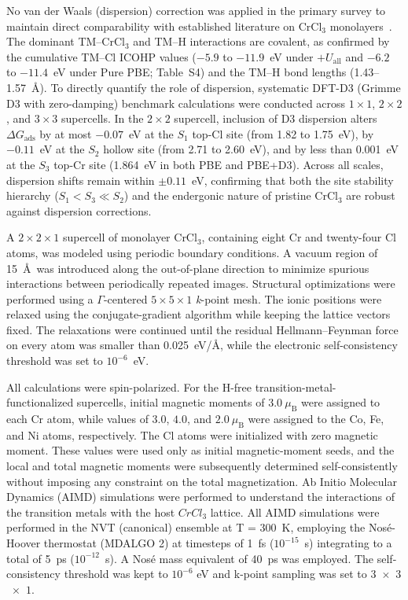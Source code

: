 \documentclass[journal=jacsat,manuscript=article]{achemso}
\begin{document}
{\color{revcolor}%
  No van der Waals (dispersion) correction was applied in the primary survey to maintain direct comparability with established literature on CrCl$_3$ monolayers~\cite{Luo2020,Mastrippolito2022,Zala2024}. The dominant TM--CrCl$_3$ and TM--H interactions are covalent, as confirmed by the cumulative TM--Cl ICOHP values ($-5.9$ to $-11.9$~eV under $+U_{\mathrm{all}}$ and $-6.2$ to $-11.4$~eV under Pure PBE; Table~S4) and the TM--H bond lengths (1.43--1.57~\AA). To directly quantify the role of dispersion, systematic DFT-D3 (Grimme D3 with zero-damping) benchmark calculations were conducted across $1\times 1$, $2\times 2$, and $3\times 3$ supercells. In the $2\times 2$ supercell, inclusion of D3 dispersion alters $\Delta G_{\mathrm{ads}}$ by at most $-0.07$~eV at the $S_1$ top-Cl site (from 1.82 to 1.75~eV), by $-0.11$~eV at the $S_2$ hollow site (from 2.71 to 2.60~eV), and by less than 0.001~eV at the $S_3$ top-Cr site (1.864~eV in both PBE and PBE+D3). Across all scales, dispersion shifts remain within $\pm 0.11$~eV, confirming that both the site stability hierarchy ($S_1 < S_3 \ll S_2$) and the endergonic nature of pristine CrCl$_3$ are robust against dispersion corrections.
\par}

A $2 \times 2 \times 1$ supercell of monolayer CrCl$_3$, containing eight Cr and twenty-four Cl atoms, was modeled using periodic boundary conditions. A vacuum region of 15~\AA\ was introduced along the out-of-plane direction to minimize spurious interactions between periodically repeated images. Structural optimizations were performed using a $\Gamma$-centered $5 \times 5 \times 1$ \textit{k}-point mesh. The ionic positions were relaxed using the conjugate-gradient algorithm while keeping the lattice vectors fixed. The relaxations were continued until the residual Hellmann--Feynman force on every atom was smaller than 0.025~eV/\AA, while the electronic self-consistency threshold was set to $10^{-6}$~eV.

All calculations were spin-polarized. For the H-free transition-metal-functionalized supercells, initial magnetic moments of $3.0~\mu_{\mathrm{B}}$ were assigned to each Cr atom, while values of $3.0$, $4.0$, and $2.0~\mu_{\mathrm{B}}$ were assigned to the Co, Fe, and Ni atoms, respectively. The Cl atoms were initialized with zero magnetic moment. These values were used only as initial magnetic-moment seeds, and the local and total magnetic moments were subsequently determined self-consistently without imposing any constraint on the total magnetization.
{\color{revcolor} %
  Ab Initio Molecular Dynamics (AIMD) simulations were performed to understand the interactions of the transition metals with the host $CrCl_3$ lattice. All AIMD simulations were performed in the NVT (canonical) ensemble at T = $300$~K, employing the Nosé-Hoover thermostat (MDALGO 2) \cite{NOSE1, NOSE2, NOSE3} at timesteps of 1~fs ($10^{-15}$~s) integrating to a total of 5~ps ($10^{-12}$~s). A Nosé mass equivalent of 40~ps was employed. The self-consistency threshold was kept to $10^{-6}$ eV and k-point sampling was set to $3$~$\times$~$3$~$\times$~$1$.
}
\end{document}
